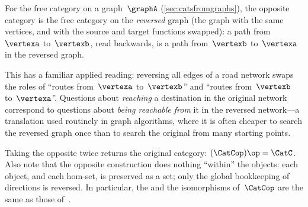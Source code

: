 \begin{example}
    \label{exa:opposite-cat-graph}
    For the free category on a graph~$\graphA$ (\cref{sec:catsfromgraphs}), the opposite category is the free category on the \emph{reversed} graph (the graph with the same vertices, and with the source and target functions swapped):
    a path from~$\vertexa$ to~$\vertexb$, read backwards, is a path from~$\vertexb$ to~$\vertexa$ in the reversed graph.

    This has a familiar applied reading: reversing all edges of a road network swaps the roles of ``routes from~$\vertexa$ to~$\vertexb$'' and ``routes from~$\vertexb$ to~$\vertexa$''.
    Questions about \emph{reaching} a destination in the original network correspond to questions about \emph{being reachable from} it in the reversed network---a translation used routinely in graph algorithms, where it is often cheaper to search the reversed graph once than to search the original from many starting points.
\end{example}

\begin{remark}
    Taking the opposite twice returns the original category: $(\CatCop)\op = \CatC$.
    Also note that the opposite construction does nothing ``within'' the objects: each object, and each hom-set, is preserved as a set; only the global bookkeeping of directions is reversed.
    In particular, the  and the isomorphisms of~$\CatCop$ are the same as those of~\CatC.
\end{remark}
